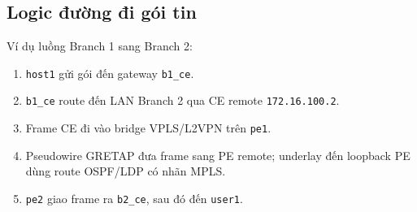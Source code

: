 \subsection{Logic đường đi gói tin}

Ví dụ luồng Branch 1 sang Branch 2:
\begin{enumerate}
    \item \texttt{host1} gửi gói đến gateway \texttt{b1\_ce}.
    \item \texttt{b1\_ce} route đến LAN Branch 2 qua CE remote \texttt{172.16.100.2}.
    \item Frame CE đi vào bridge VPLS/L2VPN trên \texttt{pe1}.
    \item Pseudowire GRETAP đưa frame sang PE remote; underlay đến loopback PE dùng route OSPF/LDP có nhãn MPLS.
    \item \texttt{pe2} giao frame ra \texttt{b2\_ce}, sau đó đến \texttt{user1}.
\end{enumerate}
